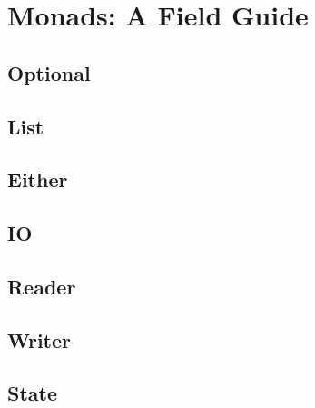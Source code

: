 
\chapter{Monads: A Field Guide}

\section{Optional}

\blindtext%

\section{List}

\blindtext%

\section{Either}

\blindtext%

\section{IO}

\blindtext%

\section{Reader}

\blindtext%

\section{Writer}

\blindtext%

\section{State}

\blindtext%
